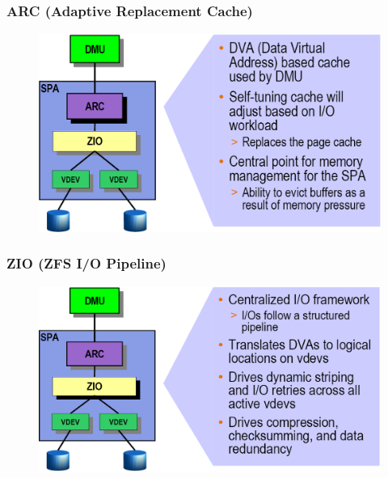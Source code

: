 % 
% 
\begin{frame}[fragile]
    \frametitle{ARC (Adaptive Replacement Cache)}
    \begin{figure}
    \includegraphics[width=0.8\linewidth]{figs/ZFS-arc.png}
    \end{figure}
\end{frame}
% 
% 
\begin{frame}[fragile]
    \frametitle{ZIO (ZFS I/O Pipeline)}
    \begin{figure}
    \includegraphics[width=0.8\linewidth]{figs/ZFS-zio.png}
    \end{figure}
\end{frame}
